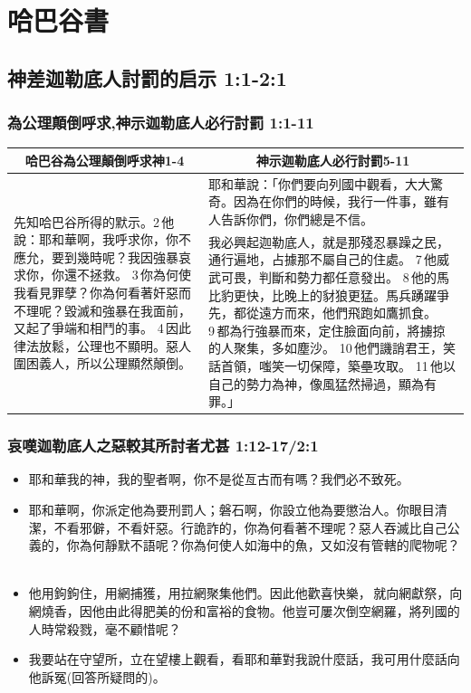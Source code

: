 \vspace{-5mm}
\chapter{哈巴谷書}
\vspace{-3mm}



\section{神差迦勒底人討罰的启示 1:1-2:1}
\subsection{為公理顛倒呼求,神示迦勒底人必行討罰 1:1-11}
\begin{table}[H]
\centering
\begin{tabular}{p{5.75cm}|p{11.50cm}}\hline\hline
\multicolumn{1}{c|}{哈巴谷為公理顛倒呼求神1-4}&\multicolumn{1}{c}{神示迦勒底人必行討罰5-11}\\\hline
\multirow{2}{5.86cm}{先知哈巴谷所得的默示。2 他說：耶和華啊，我呼求你，你不應允，要到幾時呢？我因強暴哀求你，你還不拯救。 3 你為何使我看見罪孽？你為何看著奸惡而不理呢？毀滅和強暴在我面前，又起了爭端和相鬥的事。 4 因此律法放鬆，公理也不顯明。惡人圍困義人，所以公理顯然顛倒。}
&耶和華說：「你們要向列國中觀看，大大驚奇。因為在你們的時候，我行一件事，雖有人告訴你們，你們總是不信。\\\cline{2-2}
&我必興起迦勒底人，就是那殘忍暴躁之民，通行遍地，占據那不屬自己的住處。 7 他威武可畏，判斷和勢力都任意發出。 8 他的馬比豹更快，比晚上的豺狼更猛。馬兵踴躍爭先，都從遠方而來，他們飛跑如鷹抓食。 9 都為行強暴而來，定住臉面向前，將擄掠的人聚集，多如塵沙。 10 他們譏誚君王，笑話首領，嗤笑一切保障，築壘攻取。 11 他以自己的勢力為神，像風猛然掃過，顯為有罪。」\\\hline
\end{tabular}
\end{table}

\subsection{哀嘆迦勒底人之惡較其所討者尤甚 1:12-17/2:1}
\begin{itemize} 
\itemsep-.25em 
\item 耶和華我的神，我的聖者啊，你不是從亙古而有嗎？我們必不致死。
\item 耶和華啊，你派定他為要刑罰人；磐石啊，你設立他為要懲治人。你眼目清潔，不看邪僻，不看奸惡。行詭詐的，你為何看著不理呢？惡人吞滅比自己公義的，你為何靜默不語呢？你為何使人如海中的魚，又如沒有管轄的爬物呢？  
\item 他用鉤鉤住，用網捕獲，用拉網聚集他們。因此他歡喜快樂， 就向網獻祭，向網燒香，因他由此得肥美的份和富裕的食物。他豈可屢次倒空網羅，將列國的人時常殺戮，毫不顧惜呢？
\item 我要站在守望所，立在望樓上觀看，看耶和華對我說什麼話，我可用什麼話向他訴冤(回答所疑問的)。
\end{itemize}


